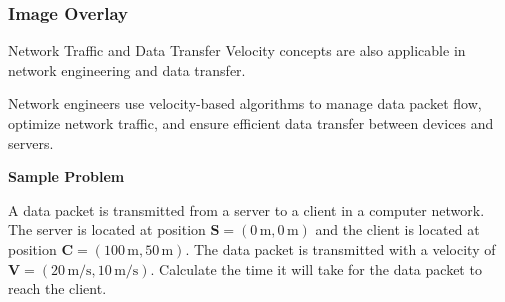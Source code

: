 \documentclass{beamer}
\begin{document}
\begin{frame}[plain]
        \frametitle{Image Overlay}
    
\end{frame}

\begin{frame}[t]{Network Traffic and Data Transfer}
\vspace{15pt}
Velocity concepts are also applicable in network engineering and data transfer.

Network engineers use velocity-based algorithms to manage data packet flow, optimize network traffic, and ensure efficient data transfer between devices and servers.

\vspace{15pt}

\textbf{Sample Problem}

A data packet is transmitted from a server to a client in a computer network. The server is located at position \( \mathbf{S} = (0 \, \text{m}, 0 \, \text{m}) \) and the client is located at position \( \mathbf{C} = (100 \, \text{m}, 50 \, \text{m}) \). The data packet is transmitted with a velocity of \( \mathbf{V} = (20 \, \text{m/s}, 10 \, \text{m/s}) \). Calculate the time it will take for the data packet to reach the client.
\end{frame}
\end{document}
